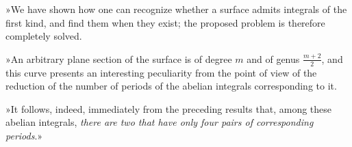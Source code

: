 \documentclass{article}
\begin{document}
»We have shown how one can recognize whether a surface admits integrals of the first kind, and find them when they exist; the proposed problem is therefore completely solved.

»An arbitrary plane section of the surface is of degree $m$ and of
genus $\frac{m + 2}{2}$, and this curve presents an interesting peculiarity from the point of view of the reduction of the number of periods of the abelian integrals corresponding to it.

»It follows, indeed, immediately from the preceding results that, among these abelian integrals, \emph{there are two that have only four pairs of corresponding periods}.»
\end{document}
